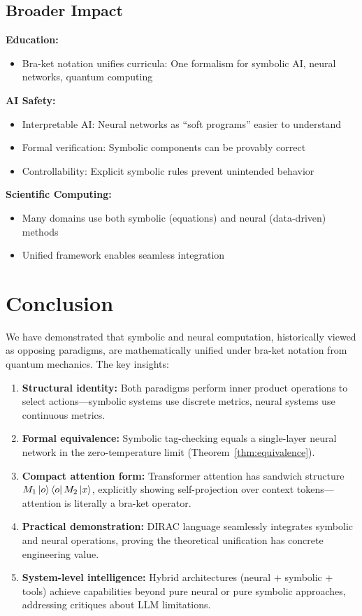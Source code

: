 \documentclass[11pt,a4paper]{article}
\theoremstyle{definition}
\begin{document}
\subsection{Broader Impact}

\textbf{Education:}
\begin{itemize}
\item Bra-ket notation unifies curricula: One formalism for symbolic AI, neural networks, quantum computing
\end{itemize}

\textbf{AI Safety:}
\begin{itemize}
\item Interpretable AI: Neural networks as ``soft programs'' easier to understand
\item Formal verification: Symbolic components can be provably correct
\item Controllability: Explicit symbolic rules prevent unintended behavior
\end{itemize}

\textbf{Scientific Computing:}
\begin{itemize}
\item Many domains use both symbolic (equations) and neural (data-driven) methods
\item Unified framework enables seamless integration
\end{itemize}

\section{Conclusion}

We have demonstrated that symbolic and neural computation, historically viewed as opposing paradigms, are mathematically unified under bra-ket notation from quantum mechanics. The key insights:

\begin{enumerate}
\item \textbf{Structural identity:} Both paradigms perform inner product operations to select actions---symbolic systems use discrete metrics, neural systems use continuous metrics.

\item \textbf{Formal equivalence:} Symbolic tag-checking equals a single-layer neural network in the zero-temperature limit (Theorem~\ref{thm:equivalence}).

\item \textbf{Compact attention form:} Transformer attention has sandwich structure $M_1 \ket{o}\bra{o} M_2 \ket{x}$, explicitly showing self-projection over context tokens---attention is literally a bra-ket operator.

\item \textbf{Practical demonstration:} DIRAC language seamlessly integrates symbolic and neural operations, proving the theoretical unification has concrete engineering value.

\item \textbf{System-level intelligence:} Hybrid architectures (neural + symbolic + tools) achieve capabilities beyond pure neural or pure symbolic approaches, addressing critiques about LLM limitations.
\end{enumerate}
\end{document}
